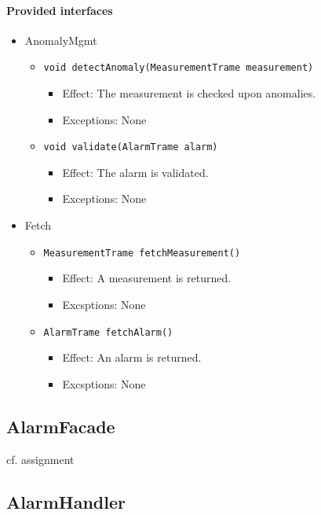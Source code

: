 \documentclass[a4paper,10pt]{article}
\begin{document}
\paragraph{Provided interfaces}
\begin{itemize}
	\item AnomalyMgmt
    \begin{itemize}
    	\item \texttt{void detectAnomaly(MeasurementTrame measurement)}
        \begin{itemize}
        	\item Effect: The measurement is checked upon anomalies.
            \item Exceptions: None
        \end{itemize}
        \item \texttt{void validate(AlarmTrame alarm)}
        \begin{itemize}
            \item Effect: The alarm is validated.
            \item Exceptions: None
		\end{itemize}
    \end{itemize}
    \item Fetch
    \begin{itemize}
    	\item \texttt{MeasurementTrame fetchMeasurement()}
        \begin{itemize}
        	\item Effect: A measurement is returned.
            \item Excsptions: None
        \end{itemize}
        \item \texttt{AlarmTrame fetchAlarm()}
        \begin{itemize}
        	\item Effect: An alarm is returned.
            \item Excsptions: None
        \end{itemize}
    \end{itemize}
\end{itemize}

\subsection{AlarmFacade}
cf. assignment

\subsection{AlarmHandler}
\end{document}
